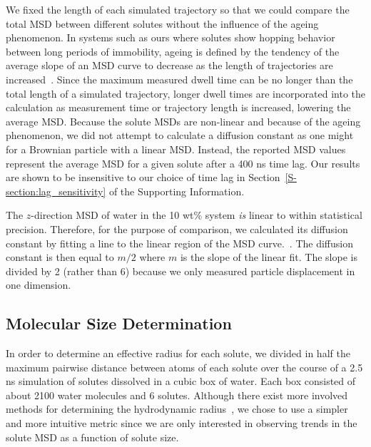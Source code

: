 \documentclass[journal=jpcbfk,manuscript=article]{achemso}
\begin{document}
  We fixed the length of each simulated trajectory so that we could compare the total
  MSD between different solutes without the influence of the ageing phenomenon.
  In systems such as ours where solutes show hopping behavior between long periods 
  of immobility, ageing is defined by the tendency of the average slope of an MSD 
  curve to decrease as the length of trajectories are increased~\cite{metzler_anomalous_2014}.
  Since the maximum measured dwell time can be no longer than the total length of a simulated
  trajectory, longer dwell times are incorporated into the calculation as measurement
  time or trajectory length is increased, lowering the average MSD. Because the solute 
  MSDs are non-linear and because of the ageing phenomenon, we did not attempt to calculate
  a diffusion constant as one might for a Brownian particle with a linear MSD. Instead,
  the reported MSD values represent the average MSD for a given	solute after a 400
  ns time lag. Our results are shown to be insensitive to our choice of time lag in 
  Section~\ref{S-section:lag_sensitivity} of the Supporting Information.
  
  The $z$-direction MSD of water in the 10 wt\% system \textit{is} linear to within 
  statistical precision. Therefore, for the purpose of comparison, we calculated its
  diffusion constant by fitting a line to the linear region of the MSD curve.~\cite{maginn_best_2018}. The diffusion constant
  is then equal to $m/2$ where $m$ is the slope of the linear fit. The slope is divided
  by 2 (rather than 6) because we only measured particle displacement in one dimension.

  \subsection{Molecular Size Determination}\label{method:molecular_size}
  
  In order to determine an effective radius for each solute, we divided in 
  half the maximum pairwise distance between atoms of each solute over the course of
  a 2.5 ns simulation of solutes dissolved in a cubic box of water. Each box 
  consisted of about 2100 water molecules and 6 solutes. Although there exist
  more involved methods for determining the hydrodynamic radius~\cite{schultz_determination_1961},
  we chose to use a simpler and more intuitive metric since we are only interested
  in observing trends in the solute MSD as a function
  of solute size.
  
\end{document}
